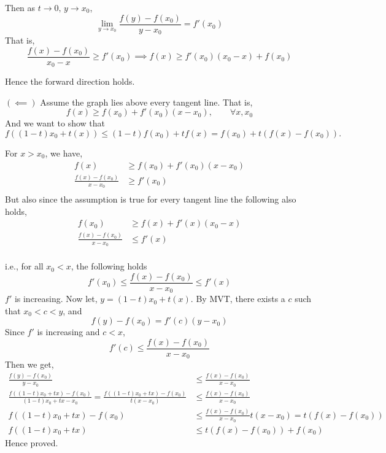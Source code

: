 \documentclass[12pt]{article}
\begin{document}
\begin{solution}
        Then as $t \to 0, \, y \to x_0 $, 
        \[\underset{y \to x_0}{\lim} \frac{f(y) - f(x_0)}{y-x_0} = f'(x_0)\]
        That is, 
        \[\frac{f(x) - f(x_0)  }{x_0 - x} \geq f'(x_0) \implies f(x) \geq f'(x_0)(x_0 -x) + f(x_0)\]

        Hence the forward direction holds. 

        \bbni 

        $(\impliedby)$
        Assume the graph lies above every tangent line. That is,
        \[f(x) \geq f(x_0) + f'(x_0)(x-x_0), \qquad \forall x,x_0 \]
        And we want to show that 
        \[f((1-t)x_0 + t(x)) \leq (1-t)f(x_0) + tf(x) = f(x_0) + t(f(x) - f(x_0)).\]


        For $x > x_0$, we have, 
        \begin{align*}
            f(x) &\geq f(x_0) + f'(x_0)(x-x_0) \\ 
            \frac{f(x)  - f(x_0)}{x-x_0}  &\geq f'(x_0)\\ 
        \end{align*}
        But also since the assumption is true for every tangent line the following also holds, 
         \begin{align*}
            f(x_0) &\geq f(x) + f'(x)(x_0-x) \\ 
            \frac{f(x)  - f(x_0)}{x-x_0}  &\leq f'(x)\\ 
        \end{align*}

        i.e., for all $x_0 < x$, the following holds
        \[f'(x_0) \leq \frac{f(x) - f(x_0)}{x-x_0} \leq f'(x)\]
        $f'$ is increasing. Now let, $y = (1-t)x_0 + t(x)$. By MVT, there exists a $c$ such that $x_0 < c < y$, and 
        \[f(y) - f(x_0) = f'(c)(y-x_0)\] 
        Since $f'$ is increasing and $c < x$,
        \[f'(c) \leq \frac{f(x) - f(x_0)}{x - x_0}\]
        Then we get, 
        \begin{align*}
            \frac{f(y) - f(x_0)}{y-x_0} &\leq \frac{f(x) - f(x_0)}{x - x_0} \\ 
            \frac{f((1-t)x_0 + tx) - f(x_0)}{(1-t)x_0 + tx-x_0} =  \frac{f((1-t)x_0 + tx) - f(x_0)}{t(x - x_0)} &\leq \frac{f(x) - f(x_0)}{x - x_0} \\ 
            {f((1-t)x_0 + tx) - f(x_0)} &\leq \frac{f(x) - f(x_0)}{x - x_0} {t(x - x_0)} = t(f(x) - f(x_0))\\
            {f((1-t)x_0 + tx)} &\leq t(f(x) - f(x_0)) + f(x_0)
        \end{align*}
        Hence proved. 


\end{solution}
\end{document}
